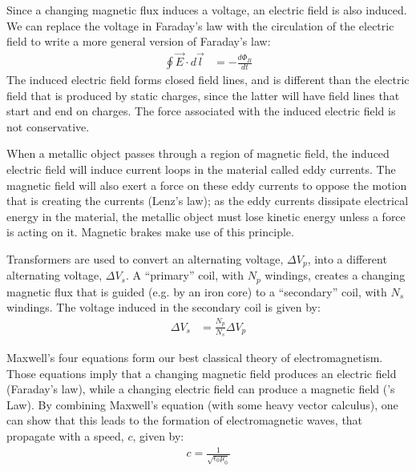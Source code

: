 \begin{chapterSummary}
Since a changing magnetic flux induces a voltage, an electric field is also induced. We can replace the voltage in Faraday's law with the circulation of the electric field to write a more general version of Faraday's law:
\begin{align*}
\oint \vec E\cdot d\vec l &= -\frac{d\Phi_B}{dt}
\end{align*}
The induced electric field forms closed field lines, and is different than the electric field that is produced by static charges, since the latter will have field lines that start and end on charges. The force associated with the induced electric field is not conservative.

When a metallic object passes through a region of magnetic field, the induced electric field will induce current loops in the material called eddy currents. The magnetic field will also exert a force on these eddy currents to oppose the motion that is creating the currents (Lenz's law); as the eddy currents dissipate electrical energy in the material, the metallic object must lose kinetic energy unless a force is acting on it. Magnetic brakes make use of this principle.

Transformers are used to convert an alternating voltage, $\Delta V_p$, into a different alternating voltage, $\Delta V_s$. A ``primary'' coil, with $N_p$ windings, creates a changing magnetic flux that is guided (e.g. by an iron core) to a ``secondary'' coil, with $N_s$ windings. The voltage induced in the secondary coil is given by:
\begin{align*}
\Delta V_s &= \frac{N_p}{N_s}\Delta V_p
\end{align*}

Maxwell's four equations form our best classical theory of electromagnetism. Those equations imply that a changing magnetic field produces an electric field (Faraday's law), while a changing electric field can produce a magnetic field (\ampere's Law). By combining Maxwell's equation (with some heavy vector calculus), one can show that this leads to the formation of electromagnetic waves, that propagate with a speed, $c$, given by:
\begin{align*}
c = \frac{1}{\sqrt{\epsilon_0\mu_0}}
\end{align*}

\end{chapterSummary}

